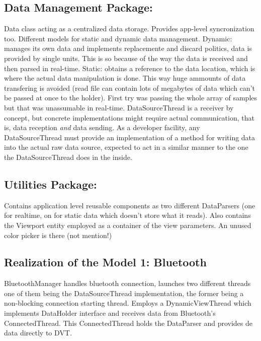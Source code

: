 		\subsection{Data Management Package:}
		Data class acting as a centralized data storage. Provides app-level syncronization too.
		Different models for static and dynamic data management.
		Dynamic: manages its own data and implements replacemente and discard politics, data is provided by single units. This is so because of the way the data is received and then parsed in real-time.
		Static: obtains a reference to the data location, which is where the actual data manipulation is done. This way huge ammounts of data transfering is avoided (read file can contain lots of megabytes of data which can't be passed at once to the holder). First try was passing the whole array of samples but that was unassumable in real-time.
		DataSourceThread is a receiver by concept, but concrete implementations might require actual communication, that is, data reception \emph{and} data sending. As a developer facility, any DataSourceThread must provide an implementation of a method for writing data into the actual raw data source, expected to act in a similar manner to the one the DataSourceThread does in the inside.

		\subsection{Utilities Package:}
		Contains application level reusable components as two different DataParsers (one for realtime, on for static data which doesn't store what it reads). Also contains the Viewport entity employed as a container of the view parameters. An unused color picker is there (not mention!)
		
		\subsection{Realization of the Model 1: Bluetooth}
			BluetoothManager handles bluetooth connection, launches two different threads one of them being the DataSourceThread implementation, the former being a non-blocking connection starting thread.
			Employs a DynamicViewThread which implements DataHolder interface and receives data from Bluetooth's ConnectedThread.
			This ConnectedThread holds the DataParser and provides de data directly to DVT.

